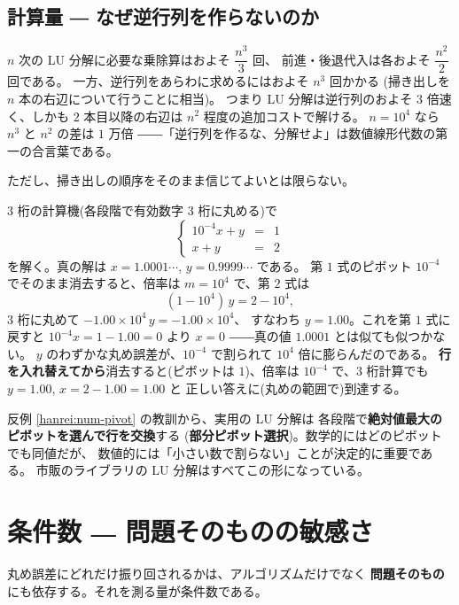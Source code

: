 \subsection*{計算量 ― なぜ逆行列を作らないのか}

$n$ 次の LU 分解に必要な乗除算はおよそ $\dfrac{n^3}{3}$ 回、
前進・後退代入は各およそ $\dfrac{n^2}{2}$ 回である。
一方、逆行列をあらわに求めるにはおよそ $n^3$ 回かかる
(掃き出しを $n$ 本の右辺について行うことに相当)。
つまり LU 分解は逆行列のおよそ $3$ 倍速く、しかも
$2$ 本目以降の右辺は $n^2$ 程度の追加コストで解ける。
$n = 10^4$ なら $n^3$ と $n^2$ の差は $1$ 万倍
――「逆行列を作るな、分解せよ」は数値線形代数の第一の合言葉である。

ただし、掃き出しの順序をそのまま信じてよいとは限らない。

\begin{hanrei}[小さなピボットが答えを壊す]\label{hanrei:num-pivot}
$3$ 桁の計算機(各段階で有効数字 $3$ 桁に丸める)で
\[
\left\{
\begin{array}{rcl}
10^{-4}x + y &=& 1 \\
x + y &=& 2
\end{array}
\right.
\]
を解く。真の解は $x = 1.0001\cdots$, $y = 0.9999\cdots$ である。
第 $1$ 式のピボット $10^{-4}$ でそのまま消去すると、倍率は
$m = 10^4$ で、第 $2$ 式は
\[
(1 - 10^4)\,y = 2 - 10^4,
\]
$3$ 桁に丸めて $-1.00 \times 10^4\,y = -1.00 \times 10^4$、
すなわち $y = 1.00$。これを第 $1$ 式に戻すと
$10^{-4}x = 1 - 1.00 = 0$ より $x = 0$
――真の値 $1.0001$ とは似ても似つかない。
$y$ のわずかな丸め誤差が、$10^{-4}$ で割られて
$10^4$ 倍に膨らんだのである。
\textbf{行を入れ替えてから}消去すると(ピボットは $1$)、倍率は
$10^{-4}$ で、$3$ 桁計算でも $y = 1.00$, $x = 2 - 1.00 = 1.00$ と
正しい答えに(丸めの範囲で)到達する。
\end{hanrei}

\begin{chui}
反例 \ref{hanrei:num-pivot} の教訓から、実用の LU 分解は
各段階で\textbf{絶対値最大のピボットを選んで行を交換}する
(\textbf{部分ピボット選択})。数学的にはどのピボットでも同値だが、
数値的には「小さい数で割らない」ことが決定的に重要である。
市販のライブラリの LU 分解はすべてこの形になっている。
\end{chui}

\section{条件数 ― 問題そのものの敏感さ}

丸め誤差にどれだけ振り回されるかは、アルゴリズムだけでなく
\textbf{問題そのもの}にも依存する。それを測る量が条件数である。

